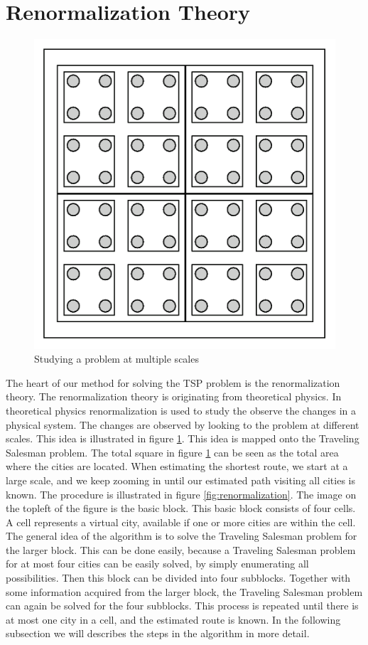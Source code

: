 \section{Renormalization Theory}
\begin{figure}[b]
\begin{center}
\includegraphics[scale=0.2]{fig/ising.png}
\caption{Studying a problem at multiple scales}
\label{fig:scales}
\end{center}
\end{figure}
The heart of our method for solving the TSP problem is the renormalization theory. The renormalization theory is originating from theoretical physics. In theoretical physics renormalization is used to study the observe the changes in a physical system. The changes are observed by looking to the problem at different scales. This idea is illustrated in figure \ref{fig:scales}.
\newline\newline\noindent
This idea is mapped onto the Traveling Salesman problem. The total square in figure \ref{fig:scales} can be seen as the total area where the cities are located. When estimating the shortest route, we start at a large scale, and we keep zooming in until our estimated path visiting all cities is known. The procedure is illustrated in figure \ref{fig:renormalization}. The image on the topleft of the figure is the basic block. This basic block consists of four cells. A cell represents a virtual city, available if one or more cities are within the cell. The general idea of the algorithm is to solve the Traveling Salesman problem for the larger block. This can be done easily, because a Traveling Salesman problem for at most four cities can be easily solved, by simply enumerating all possibilities. Then this block can be divided into four subblocks. Together with some information acquired from the larger block, the Traveling Salesman problem can again be solved for the four subblocks. This process is repeated until there is at most one city in a cell, and the estimated route is known. In the following subsection we will describes the steps in the algorithm in more detail.
